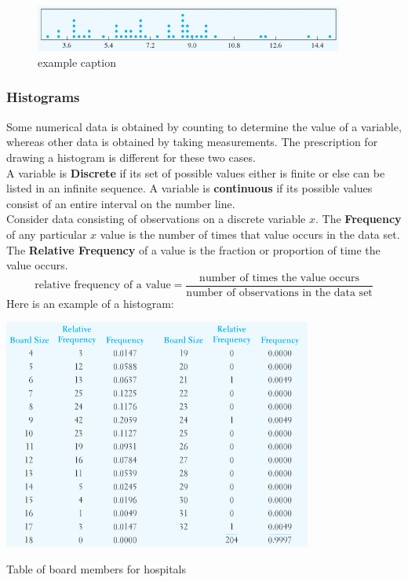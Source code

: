 \documentclass{article}
\begin{document}
		\begin{figure}[!htb]
		   \centering
		   \includegraphics[width=4in]{dotplot_example.jpg} 
		   \caption{example caption}
		   \label{fig:example}
		\end{figure}
		
		\subsubsection{Histograms} 
		Some numerical data is obtained by counting to determine the value of a variable, 
		whereas other data is obtained by taking measurements. The prescription for drawing a 
		histogram is different for these two cases. \\
	
		A variable is \textbf{Discrete} if its set of possible values either is finite or else can be listed 
		in an infinite sequence. A variable is \textbf{continuous} if its possible values consist of an 
		entire interval on the number line. \\
		Consider data consisting of observations on a discrete variable $x$. The 
		\textbf{Frequency} of any particular $x$ value is the number of times that value occurs in 
		the data set. The \textbf{Relative Frequency} of a value is the fraction or proportion of time 
		the value occurs.
		\[ \text{relative frequency of a value} = \frac{\text{number of times the value occurs}}
		{\text{number of observations in the data set}} \]
		Here is an example of a histogram:
	
		\begin{table}[!htb]
		   \centering
		   \includegraphics[width=4in]{histo_example_table.jpg} 
		   \caption{Table of board members for hospitals}
		   \label{tab:histo_table}
		\end{table}
	
\end{document}
